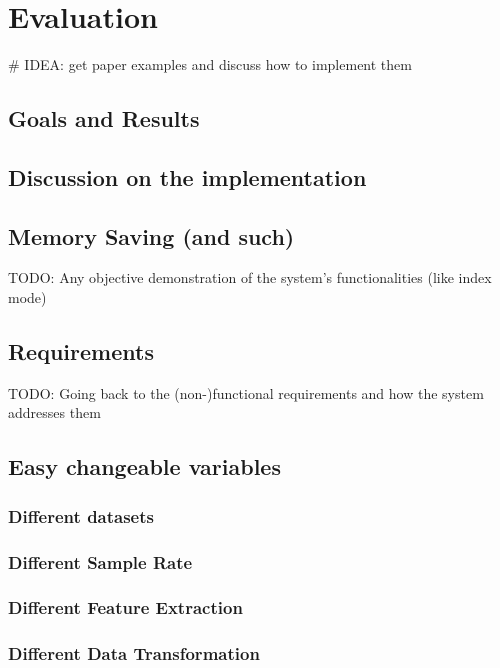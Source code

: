 \chapter{Evaluation}

# IDEA: get paper examples and discuss how to implement them

\section{Goals and Results}

\section{Discussion on the implementation}

\section{Memory Saving (and such)}

TODO: Any objective demonstration of the system's functionalities (like index mode)

\section{Requirements}

TODO: Going back to the (non-)functional requirements and how the system addresses them


\section{Easy changeable variables}

\subsection{Different datasets}

\subsection{Different Sample Rate}

\subsection{Different Feature Extraction}

\subsection{Different Data Transformation}

